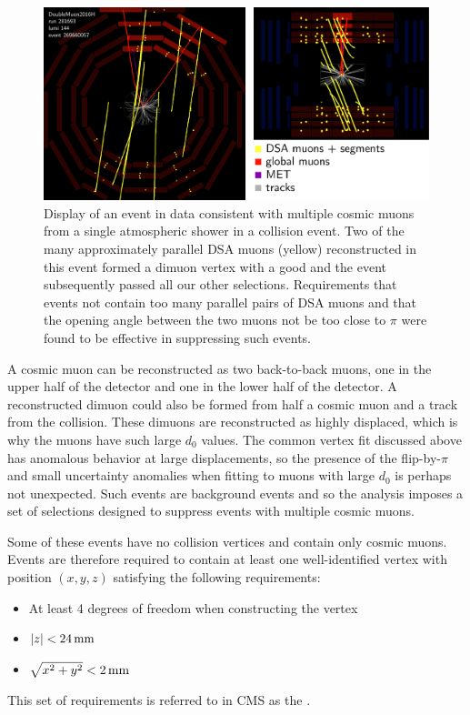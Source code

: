 \begin{figure}[htpb]
  \centering
  \includegraphics[width=\textwidth]{figures/displaced/ED_Cosmic.pdf}
  \caption[Display of an event in data consistent with multiple cosmic muons from a single atmospheric shower in a \pp collision event.]{Display of an event in data consistent with multiple cosmic muons from a single atmospheric shower in a \pp collision event. Two of the many approximately parallel DSA muons (yellow) reconstructed in this event formed a dimuon vertex with a good \vchisq and the event subsequently passed all our other selections. Requirements that events not contain too many parallel pairs of DSA muons and that the opening angle between the two muons not be too close to $\pi$ were found to be effective in suppressing such events.}
  \label{fig:dd:shower}
\end{figure}

A cosmic muon can be reconstructed as two back-to-back muons, one in the upper half of the detector and one in the lower half of the detector.
A reconstructed dimuon could also be formed from half a cosmic muon and a track from the \pp collision.
These dimuons are reconstructed as highly displaced, which is why the muons have such large $d_0$ values.
The common vertex fit discussed above has anomalous behavior at large displacements, so the presence of the flip-by-$\pi$ and small \pT uncertainty anomalies when fitting to muons with large $d_0$ is perhaps not unexpected.
Such events are background events and so the analysis imposes a set of selections designed to suppress events with multiple cosmic muons.

Some of these events have no \pp collision vertices and contain only cosmic muons.
Events are therefore required to contain at least one well-identified vertex with position $(x, y, z)$ satisfying the following requirements:
\pagebreak
\begin{itemize}
  \item At least 4 degrees of freedom when constructing the vertex
  \item $|z| < 24\,\text{mm}$
  \item $\sqrt{x^2 + y^2} < 2\,\text{mm}$
\end{itemize}
This set of requirements is referred to in CMS as the .

